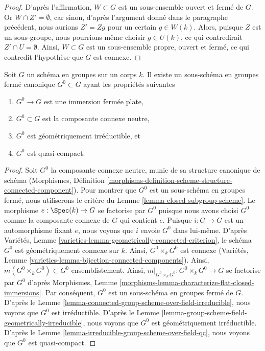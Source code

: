 \begin{proof}
\medskip\noindent
D'après l'affirmation, $W \subset G$ est un sous-ensemble ouvert et fermé de $G$.
Or $W \cap Z' = \emptyset$, car sinon, d'après l'argument donné dans
le paragraphe précédent, nous aurions $Z' = Zg$ pour un certain $g \in W(k)$.
Alors, puisque $Z$ est un sous-groupe, nous pourrions même choisir $g \in U(k)$, ce qui
contredirait $Z' \cap U = \emptyset$. Ainsi, $W \subset G$ est un sous-ensemble propre, ouvert
et fermé, ce qui contredit l'hypothèse que $G$ est connexe.
\end{proof}

\begin{proposition}
\label{proposition-connected-component}
Soit $G$ un schéma en groupes sur un corps $k$. Il existe un sous-schéma
en groupes fermé canonique $G^0 \subset G$ ayant les propriétés suivantes
\begin{enumerate}
\item $G^0 \to G$ est une immersion fermée plate,
\item $G^0 \subset G$ est la composante connexe neutre,
\item $G^0$ est géométriquement irréductible, et
\item $G^0$ est quasi-compact.
\end{enumerate}
\end{proposition}

\begin{proof}
Soit $G^0$ la composante connexe neutre, munie de sa structure canonique
de schéma (Morphismes, Définition
\ref{morphisms-definition-scheme-structure-connected-component}).
Pour montrer que $G^0$ est un sous-schéma en groupes fermé, nous utiliserons le
critère du Lemme \ref{lemma-closed-subgroup-scheme}.
Le morphisme $e : \Spec(k) \to G$ se factorise par $G^0$ puisque nous avons choisi
$G^0$ comme la composante connexe de $G$ qui contient $e$.
Puisque $i : G \to G$ est un automorphisme fixant $e$, nous voyons que
$i$ envoie $G^0$ dans lui-même.
D'après Variétés, Lemme \ref{varieties-lemma-geometrically-connected-criterion},
le schéma $G^0$ est géométriquement connexe sur $k$.
Ainsi, $G^0 \times_k G^0$ est connexe
(Variétés, Lemme \ref{varieties-lemma-bijection-connected-components}).
Ainsi, $m(G^0 \times_k G^0) \subset G^0$ ensemblistement.
Ainsi, $m|_{G^0 \times_k G^0} : G^0 \times_k G^0 \to G$
se factorise par $G^0$ d'après
Morphismes, Lemme \ref{morphisms-lemma-characterize-flat-closed-immersions}.
Par conséquent, $G^0$ est un sous-schéma en groupes fermé de $G$.
D'après le Lemme \ref{lemma-connected-group-scheme-over-field-irreducible},
nous voyons que $G^0$ est irréductible. D'après
le Lemme \ref{lemma-group-scheme-field-geometrically-irreducible},
nous voyons que $G^0$ est géométriquement irréductible. D'après
le Lemme \ref{lemma-irreducible-group-scheme-over-field-qc},
nous voyons que $G^0$ est quasi-compact.
\end{proof}

